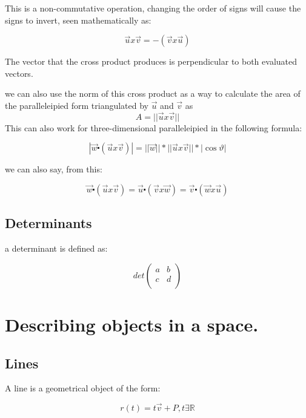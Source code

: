 \documentclass[11pt,fleqn]{book} %
\begin{document}
This is a non-commutative operation, changing the order of signs will cause the signs to invert,
seen mathematically as:

$$ \vec{u} x \vec{v} = -(\vec{v} x \vec{u}) $$

The vector that the cross product produces is perpendicular to both evaluated vectors.


we can also use the norm of this cross product as a way to calculate the area of the paralleleipied form 
triangulated by $\vec{u}$ and $\vec{v}$ as $$ A = ||\vec{u}x \vec{v}|| $$ 
This can also work for three-dimensional paralleleipied in the following formula:

\begin{equation}
    |\vec{w} \centerdot (\vec{u}x\vec{v})| = ||\vec{w}|| * ||\vec{u}x\vec{v}|| * |\cos \vartheta| 
\end{equation}

we can also say, from this:


\begin{equation}
    \vec{w} \centerdot (\vec{u}x\vec{v}) = \vec{u} \centerdot (\vec{v}x\vec{w}) = \vec{v} \centerdot (\vec{w}x\vec{u})
\end{equation}

\subsection{Determinants}

a determinant is defined as:

\begin{equation}
    det
    \begin{pmatrix}
        a & b \\
        c & d \\
    \end{pmatrix}
\end{equation}

\section{Describing objects in a space.}

\subsection{Lines}

A line is a geometrical object of the form:

\begin{equation}
    r(t) = t \vec{v} + P, t \exists \mathbb{R}
\end{equation}
\end{document}

